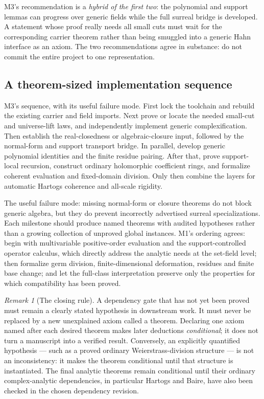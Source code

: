 \documentclass[11pt,letterpaper]{article}
\numberwithin{equation}{section}
\theoremstyle{definition}
\theoremstyle{remark}
\newtheorem{remark}[theorem]{Remark}
\begin{document}
\noindent M3's recommendation is a \emph{hybrid of the first two}: the polynomial
and support lemmas can progress over generic fields while the full surreal bridge
is developed. A statement whose proof really needs all small cuts must wait for
the corresponding carrier theorem rather than being smuggled into a generic Hahn
interface as an axiom. The two recommendations agree in substance: do not commit
the entire project to one representation.

\subsection{A theorem-sized implementation sequence}
\label{found:sub:sequence}
M3's sequence, with its useful failure mode. First lock the toolchain and rebuild
the existing carrier and field imports. Next prove or locate the needed
small-cut and universe-lift laws, and independently implement generic
complexification. Then establish the real-closedness or algebraic-closure input,
followed by the normal-form and support transport bridge. In parallel, develop
generic polynomial identities and the finite residue pairing. After that, prove
support-local recursion, construct ordinary holomorphic coefficient rings, and
formalize coherent evaluation and fixed-domain division. Only then combine the
layers for automatic Hartogs coherence and all-scale rigidity.

The useful failure mode: missing normal-form or closure theorems do not block
generic algebra, but they do prevent incorrectly advertised surreal
specializations. Each milestone should produce named theorems with audited
hypotheses rather than a growing collection of unproved global instances. M1's
ordering agrees: begin with multivariable positive-order evaluation and the
support-controlled operator calculus, which directly address the analytic needs
at the set-field level; then formalize germ division, finite-dimensional
deformation, residues and finite base change; and let the full-class
interpretation preserve only the properties for which compatibility has been
proved.

\begin{remark}[The closing rule]\label{found:rem:closingrule}
A dependency gate that has not yet been proved must remain a clearly stated
hypothesis in downstream work. It must never be replaced by a new unexplained
axiom called a theorem. Declaring one axiom named after each desired theorem
makes later deductions \emph{conditional}; it does not turn a manuscript into a
verified result. Conversely, an explicitly quantified hypothesis --- such as a
proved ordinary Weierstrass-division structure --- is not an inconsistency: it
makes the theorem conditional until that structure is instantiated. The final
analytic theorems remain conditional until their ordinary complex-analytic
dependencies, in particular Hartogs and Baire, have also been checked in the
chosen dependency revision.
\end{remark}
\end{document}
